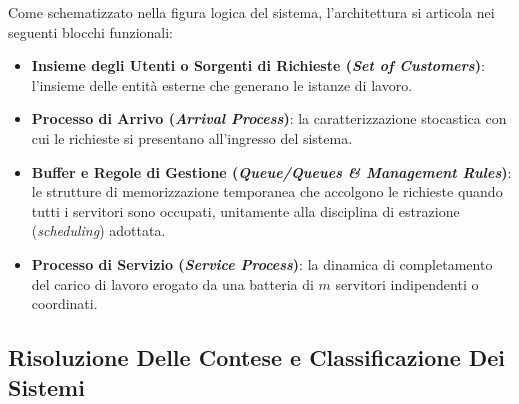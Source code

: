 \documentclass[11pt, a4paper]{article}
\begin{document}
Come schematizzato nella figura logica del sistema, l'architettura si articola nei seguenti blocchi funzionali:
\begin{itemize}[leftmargin=*]
    \item \textbf{Insieme degli Utenti o Sorgenti di Richieste (\emph{Set of Customers})}: l'insieme delle entità esterne che generano le istanze di lavoro.
    \item \textbf{Processo di Arrivo (\emph{Arrival Process})}: la caratterizzazione stocastica con cui le richieste si presentano all'ingresso del sistema.
    \item \textbf{Buffer e Regole di Gestione (\emph{Queue/Queues \& Management Rules})}: le strutture di memorizzazione temporanea che accolgono le richieste quando tutti i servitori sono occupati, unitamente alla disciplina di estrazione (\emph{scheduling}) adottata.
    \item \textbf{Processo di Servizio (\emph{Service Process})}: la dinamica di completamento del carico di lavoro erogato da una batteria di $m$ servitori indipendenti o coordinati.
\end{itemize}

\subsection{Risoluzione Delle Contese e Classificazione Dei Sistemi}
\end{document}
